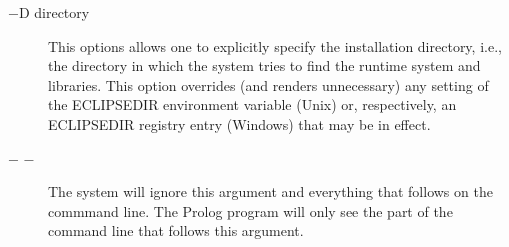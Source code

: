 \begin{description}
\item[$-$D directory]
This options allows one to explicitly specify the {\eclipse} installation
directory, i.e., the directory in which the system tries to find
the {\eclipse} runtime system and libraries.  This option overrides
(and renders unnecessary) any setting of the ECLIPSEDIR environment
variable (Unix) or, respectively, an ECLIPSEDIR registry entry
(Windows) that may be in effect.

\item[$-$ $-$]\cmdlineoptionidx{-}
The {\eclipse} system will ignore this argument and everything that follows on
the commmand line. The Prolog program will only see the part of the
command line that follows this argument.
\end{description}


